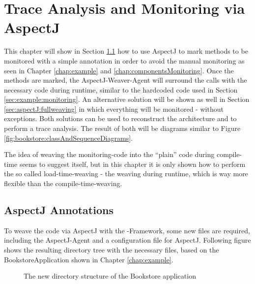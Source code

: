 \chapter{Trace Analysis and Monitoring via AspectJ}\label{chap:aspectJ}

This chapter will show in Section \ref{sec:aspectJ:annotation} how
to use AspectJ to mark methods to be monitored with a simple annotation
in order to avoid the manual monitoring as seen in Chapter \ref{chap:example}
and \ref{chap:componentsMonitoring}. Once the methods are marked, the AspectJ-Weaver-Agent
will surround the calls with the necessary code during runtime, similar
to the hardcoded code used in Section \ref{sec:example:monitoring}.
An alternative solution will be shown as well in Section \ref{sec:aspectJ:fullweaving}
in which everything will be monitored - without exceptions. Both solutions
can be used to reconstruct the architecture and to perform a trace
analysis. The result of both will be diagrams similar to Figure \ref{fig:bookstore:classAndSequenceDiagrams}.

The idea of weaving the monitoring-code into the ``plain'' code
during compile-time seems to suggest itself, but in this chapter it
is only shown how to perform the so called load-time-weaving - the
weaving during runtime, which is way more flexible than the compile-time-weaving.

\section{AspectJ Annotations}\label{sec:aspectJ:annotation}

To weave the code via AspectJ with the \Kieker{}-Framework,
some new files are required, including the AspectJ-Agent and a configuration
file for AspectJ. Following figure shows the resulting directory tree
with the necessary files, based on the BookstoreApplication shown
in Chapter \ref{chap:example}.

\begin{figure}[H]
\begin{graybox}
\end{graybox}

\caption{The new directory structure of the Bookstore application}
\end{figure}

